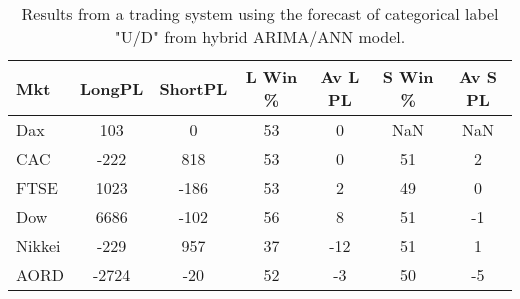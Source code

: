 \begin{table}[ht]
\centering
\caption[Results from a trading system using the forecast of categorical label "U/D" from hybrid ARIMA/ANN model]{Results from a trading system using the forecast of categorical label "U/D" from hybrid ARIMA/ANN model.} 
\label{tab:chp_ts:pUD_CAT_arima_ann_sys}
\begin{tabular}{lcccccc}
  \toprule Mkt & LongPL & ShortPL & L Win \% & Av L PL & S Win \% & Av S PL \\ 
  \midrule Dax & 103 & 0 & 53 & 0 & NaN & NaN \\ 
  CAC & -222 & 818 & 53 & 0 & 51 & 2 \\ 
  FTSE & 1023 & -186 & 53 & 2 & 49 & 0 \\ 
  Dow & 6686 & -102 & 56 & 8 & 51 & -1 \\ 
  Nikkei & -229 & 957 & 37 & -12 & 51 & 1 \\ 
  AORD & -2724 & -20 & 52 & -3 & 50 & -5 \\ 
   \bottomrule \end{tabular}
\end{table}
